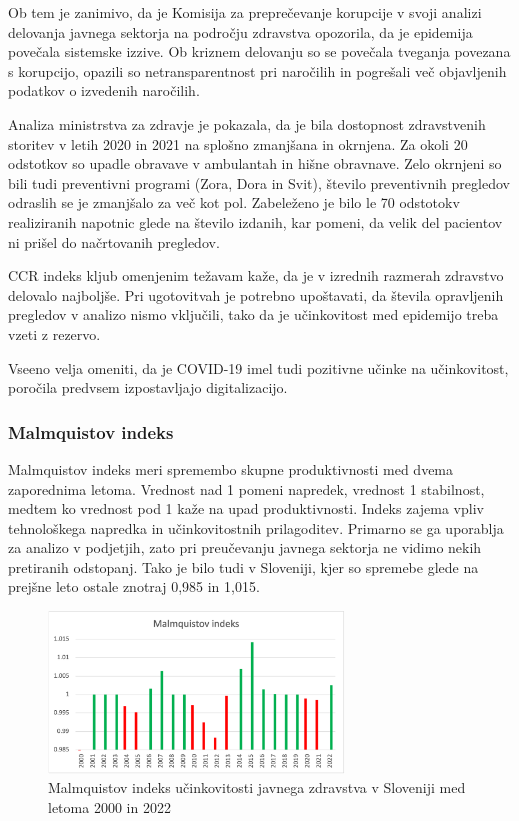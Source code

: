 \documentclass[12pt,a4paper]{article}
\theoremstyle{definition}
\begin{document}
Ob tem je zanimivo, da je Komisija za preprečevanje korupcije v svoji analizi delovanja javnega sektorja na področju zdravstva opozorila, da je epidemija povečala sistemske izzive. 
Ob kriznem delovanju so se povečala tveganja povezana s korupcijo, opazili so netransparentnost pri naročilih in pogrešali več objavljenih podatkov o izvedenih naročilih. 
\cite{analizaJavnegaZdravstva2023} 

Analiza ministrstva za zdravje je pokazala, da je bila dostopnost zdravstvenih storitev v letih 2020 in 2021 na splošno zmanjšana in okrnjena. 
Za okoli 20 odstotkov so upadle obravave v ambulantah in hišne obravnave. Zelo okrnjeni so bili tudi preventivni programi (Zora, Dora in Svit), število preventivnih pregledov odraslih se je zmanjšalo za več kot pol. 
Zabeleženo je bilo le 70 odstotokv realiziranih napotnic glede na število izdanih, kar pomeni, da velik del pacientov ni prišel do načrtovanih pregledov. \cite{jamsek2022analiza}

CCR indeks kljub omenjenim težavam kaže, da je v izrednih razmerah zdravstvo delovalo najboljše. Pri ugotovitvah je potrebno upoštavati, da števila opravljenih pregledov v analizo nismo vključili, tako da je učinkovitost med epidemijo treba vzeti z rezervo.

Vseeno velja omeniti, da je COVID-19 imel tudi pozitivne učinke na učinkovitost, poročila predvsem izpostavljajo digitalizacijo.


\subsubsection{Malmquistov indeks}
Malmquistov indeks meri spremembo skupne produktivnosti med dvema zaporednima letoma. 
Vrednost nad 1 pomeni napredek, vrednost 1 stabilnost, medtem ko vrednost pod 1 kaže na upad produktivnosti. 
Indeks zajema vpliv tehnološkega napredka in učinkovitostnih prilagoditev. Primarno se ga uporablja za analizo v podjetjih, 
zato pri preučevanju javnega sektorja ne vidimo nekih pretiranih odstopanj. 
Tako je bilo tudi v Sloveniji, kjer so spremebe glede na prejšne leto ostale znotraj 0,985 in 1,015.

\begin{figure}[H]
    \centering
    \includegraphics[width=0.7\textwidth]{malmq_ind_slo.png}
    \caption{Malmquistov indeks učinkovitosti javnega zdravstva v Sloveniji med letoma 2000 in 2022}
    \label{fig:malmq_ind_slo.png}
\end{figure}
\end{document}
